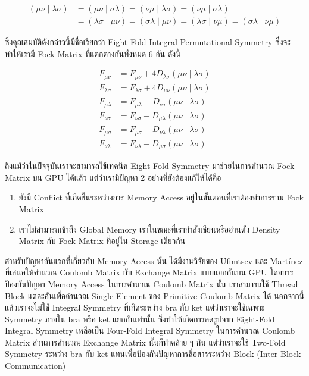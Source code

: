 \begin{equation}
  \begin{aligned}
    (\mu \nu \mid \lambda \sigma)
     & = (\mu \nu \mid \sigma \lambda)
    = (\nu \mu \mid \lambda \sigma)
    = (\nu \mu \mid \sigma \lambda)    \\
     & = (\lambda \sigma \mid \mu \nu)
    = (\sigma \lambda \mid \mu \nu)
    = (\lambda \sigma \mid \nu \mu)
    = (\sigma \lambda \mid \nu \mu)
  \end{aligned}
\end{equation}

\noindent ซึ่งคุณสมบัติดังกล่าวนี้มีชื่อเรียกว่า Eight-Fold Integral Permutational Symmetry ซึ่งจะทำให้เรามี Fock Matrix
ที่แตกต่างกันทั้งหมด 6 อัน ดังนี้

\begin{equation}
  \begin{aligned}
    F_{\mu \nu}        & = F_{\mu \nu}+4 D_{\lambda \sigma}(\mu \nu \mid \lambda \sigma) \\
    F_{\lambda \sigma} & =F_{\lambda \sigma}+4 D_{\mu \nu}(\mu \nu \mid \lambda \sigma)  \\
    F_{\mu \lambda}    & =F_{\mu \lambda}-D_{\nu \sigma}(\mu \nu \mid \lambda \sigma)    \\
    F_{\nu \sigma}     & =F_{\nu \sigma}-D_{\mu \lambda}(\mu \nu \mid \lambda \sigma)    \\
    F_{\mu \sigma}     & =F_{\mu \sigma}-D_{\nu \lambda}(\mu \nu \mid \lambda \sigma)    \\
    F_{\nu \lambda}    & =F_{\nu \lambda}-D_{\mu \sigma}(\mu \nu \mid \lambda \sigma)
  \end{aligned}
\end{equation}

ถึงแม้ว่าในปัจจุบันเราจะสามารถใช้เทคนิค Eight-Fold Symmetry มาช่วยในการคำนวณ Fock Matrix บน GPU ได้แล้ว แต่ว่าเรามีปัญหา 2
อย่างที่ยังต้องแก้ให้ได้คือ

\begin{enumerate}[topsep=0pt,noitemsep]
  \setlength\itemsep{1em}
  \item ยังมี Conflict ที่เกิดขึ้นระหว่างการ Memory Access อยู่ในขั้นตอนที่เราต้องทำการรวม Fock Matrix

  \item เราไม่สามารถเข้าถึง Global Memory เราในขณะที่เรากำลังเชียนหรืออ่านตัว Density Matrix กับ Fock Matrix ที่อยู่ใน Storage
        เดียวกัน
\end{enumerate}

สำหรับปัญหาอันแรกที่เกี่ยวกับ Memory Access นั้น ได้มีงานวิจัยของ Ufimtsev และ Martínez ที่เสนอให้คำนวณ Coulomb Matrix กับ
Exchange Matrix แบบแยกกันบน GPU โดยการป้องกันปัญหา Memory Access ในการคำนวณ Coulomb Matrix นั้น เราสามารถใช้
Thread Block แต่ละอันเพื่อคำนวณ Single Element ของ Primitive Coulomb Matrix ได้ นอกจากนี้แล้วเราจะไม่ใช้ Integral
Symmetry ที่เกิดระหว่าง bra กับ ket แต่ว่าเราจะใช้เฉพาะ Symmetry ภายใน bra หรือ ket แยกกันเท่านั้น ซึ่งทำให้เกิดการลดรูปจาก
Eight-Fold Integral Symmetry เหลือเป็น Four-Fold Integral Symmetry ในการคำนวณ Coulomb Matrix ส่วนการคำนวณ
Exchange Matrix นั้นก็ทำคล้าย ๆ กัน แต่ว่าเราจะใช้ Two-Fold Symmetry ระหว่าง bra กับ ket แทนเพื่อป้องกันปัญหาการสื่อสารระหว่าง
Block (Inter-Block Communication)

